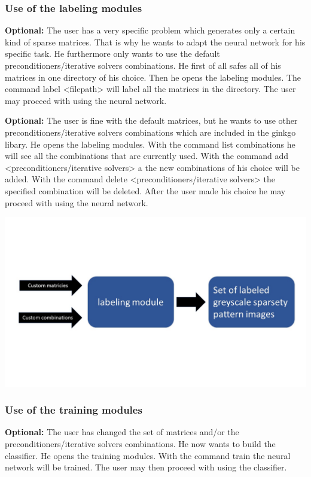 \documentclass[parskip=full]{scrartcl}
\begin{document}
\subsubsection{Use of the \glspl{labeling module}}
\textbf{Optional:} The user has a very specific problem which generates only a certain kind of sparse matrices. That is why he wants to adapt the neural network for his specific task. He furthermore only wants to use the default \glspl{preconditioner}/\glspl{iterative solver} combinations. He first of all safes all of his matrices in one directory of his choice. Then he opens the \glspl{labeling module}. The command label <filepath> will label all the matrices in the directory. The user may proceed with using the neural network.


\textbf{Optional:} The user is fine with the default matrices, but he wants to use other \glspl{preconditioner}/\glspl{iterative solver} combinations which are included in the ginkgo libary. He opens the \glspl{labeling module}. With the command list combinations he will see all the combinations that are currently used. With the command add <\glspl{preconditioner}/\glspl{iterative solver}> a the new combinations of his choice will be added. With the command delete <\glspl{preconditioner}/\glspl{iterative solver}> the specified combination will be deleted. After the user made his choice he may proceed with using the neural network.
\begin{center}
\includegraphics[width=\textwidth]{labelingModule}
\end{center}


\subsubsection{Use of the \glspl{training module}}
\textbf{Optional:} The user has changed the set of matrices and/or the \glspl{preconditioner}/\glspl{iterative solver} combinations. He now wants to build the classifier. He opens the \glspl{training module}. With the command train the neural network will be trained. The user may then proceed with using the classifier.
\end{document}
